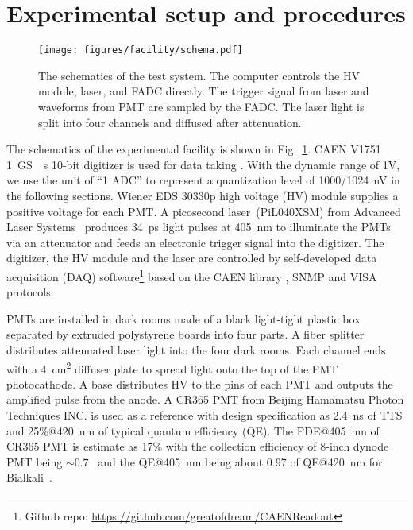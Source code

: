 \section{Experimental setup and procedures}
\label{SetUp}
\begin{figure}[!htbp]
    \centering
    \texttt{[image: figures/facility/schema.pdf]}
    \caption{The schematics of the test system. The computer controls the HV module, laser, and FADC directly. The trigger signal from laser and waveforms from PMT are sampled by the FADC. The laser light is split into four channels and diffused after attenuation.}
    \label{fig:facility}
\end{figure}

The schematics of the experimental facility is shown in Fig.~\ref{fig:facility}. CAEN V1751 \SI{1}{GS \per s} 10-bit digitizer is used for data taking \cite{CAENV1751}. With the dynamic range of 1V, we use the unit of ``1 ADC''  to represent a quantization level of 1000/1024\,mV \cite{JUNOPrototype} in the following sections. Wiener EDS 30330p high voltage (HV) module \cite{WIENERHV} supplies a positive voltage for each PMT. A picosecond laser~(PiL040XSM) from Advanced Laser Systems~\cite{NTKLaser} produces \SI{34}{ps} light pulses at \SI{405}{nm} to illuminate the PMTs via an attenuator and feeds an electronic trigger signal into the digitizer. The digitizer, the HV module and the laser are controlled by self-developed data acquisition (DAQ) software\footnote{Github repo: \url{https://github.com/greatofdream/CAENReadout}} based on the CAEN library \cite{CAENLIB}, SNMP \cite{SNMP} and VISA \cite{VISA} protocols.

PMTs are installed in dark rooms made of a black light-tight plastic box separated by extruded polystyrene boards into four parts. A fiber splitter distributes attenuated laser light into the four dark rooms. Each channel ends with a \SI{4}{cm\tothe{2}} diffuser plate to spread light onto the top of the PMT photocathode.
A base distributes HV to the pins of each PMT and outputs the amplified pulse from the anode. A CR365 PMT \cite{BJBS} from Beijing Hamamatsu Photon Techniques INC. is used as a reference with design specification as \SI{2.4}{ns} of TTS and 25\%@\SI{420}{nm} of typical quantum efficiency (QE). The PDE@\SI{405}{nm} of CR365 PMT is estimate as 17\% with the collection efficiency of 8-inch dynode PMT being $\sim0.7$~\cite{R5912MOD,RCESpotlight,WANG2012113} and the QE@\SI{405}{nm} being about 0.97 of QE@\SI{420}{nm} for Bialkali~\cite{HAMAMATSUManual}.

